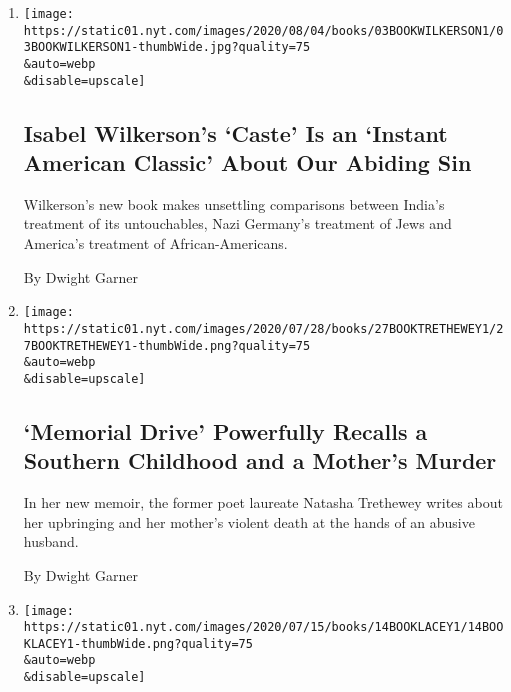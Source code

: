 \begin{enumerate}
\def\labelenumi{\arabic{enumi}.}
\item
  \href{/2020/07/31/books/review-caste-isabel-wilkerson-origins-of-our-discontents.html}{}

  \texttt{[image: https://static01.nyt.com/images/2020/08/04/books/03BOOKWILKERSON1/03BOOKWILKERSON1-thumbWide.jpg?quality=75\\\&auto=webp\\\&disable=upscale]}

  \hypertarget{isabel-wilkersons-caste-is-an-instant-american-classic-about-our-abiding-sin}{%
  \subsection{Isabel Wilkerson's `Caste' Is an `Instant American
  Classic' About Our Abiding
  Sin}\label{isabel-wilkersons-caste-is-an-instant-american-classic-about-our-abiding-sin}}

  Wilkerson's new book makes unsettling comparisons between India's
  treatment of its untouchables, Nazi Germany's treatment of Jews and
  America's treatment of African-Americans.

  By Dwight Garner
\item
  \href{/2020/07/27/books/review-memorial-drive-memoir-natasha-trethewey.html}{}

  \texttt{[image: https://static01.nyt.com/images/2020/07/28/books/27BOOKTRETHEWEY1/27BOOKTRETHEWEY1-thumbWide.png?quality=75\\\&auto=webp\\\&disable=upscale]}

  \hypertarget{memorial-drive-powerfully-recalls-a-southern-childhood-and-a-mothers-murder}{%
  \subsection{`Memorial Drive' Powerfully Recalls a Southern Childhood
  and a Mother's
  Murder}\label{memorial-drive-powerfully-recalls-a-southern-childhood-and-a-mothers-murder}}

  In her new memoir, the former poet laureate Natasha Trethewey writes
  about her upbringing and her mother's violent death at the hands of an
  abusive husband.

  By Dwight Garner
\item
  \href{/2020/07/13/books/review-pew-catherine-lacey.html}{}

  \texttt{[image: https://static01.nyt.com/images/2020/07/15/books/14BOOKLACEY1/14BOOKLACEY1-thumbWide.png?quality=75\\\&auto=webp\\\&disable=upscale]}

  \hypertarget{in-pew-a-mysterious-stranger-tests-a-small-towns-tolerance}{%
}
\end{enumerate}
